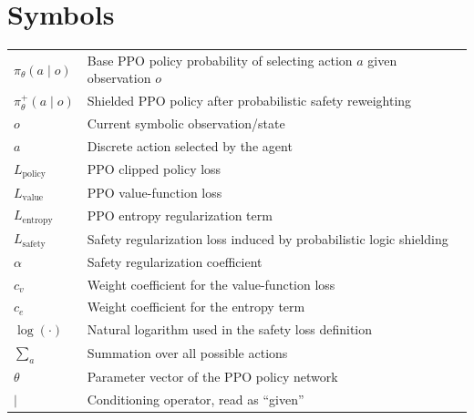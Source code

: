 \documentclass[master=mai,openany]{kulemt}
\begin{document}
\section*{Symbols}
\begin{flushleft}
  \renewcommand{\arraystretch}{1.1}
  \begin{tabularx}{\textwidth}{@{}p{28mm}X@{}}

    $\pi_{\theta}(a \mid o)$ 
      & Base PPO policy probability of selecting action $a$ given observation $o$ \\

    $\pi_{\theta}^{+}(a \mid o)$ 
      & Shielded PPO policy after probabilistic safety reweighting \\

    $o$ 
      & Current symbolic observation/state \\

    $a$ 
      & Discrete action selected by the agent \\

    $L_{\mathrm{policy}}$ 
      & PPO clipped policy loss \\

    $L_{\mathrm{value}}$ 
      & PPO value-function loss \\

    $L_{\mathrm{entropy}}$ 
      & PPO entropy regularization term \\

    $L_{\mathrm{safety}}$ 
      & Safety regularization loss induced by probabilistic logic shielding \\

    $\alpha$ 
      & Safety regularization coefficient \\

    $c_v$ 
      & Weight coefficient for the value-function loss \\

    $c_e$ 
      & Weight coefficient for the entropy term \\

    $\log(\cdot)$ 
      & Natural logarithm used in the safety loss definition \\

    $\sum_{a}$ 
      & Summation over all possible actions \\

    $\theta$ 
      & Parameter vector of the PPO policy network \\

    $\mid$ 
      & Conditioning operator, read as ``given'' \\

  \end{tabularx}
\end{flushleft}

\mainmatter







\appendixpage*          %
\appendix

\backmatter



\end{document}
